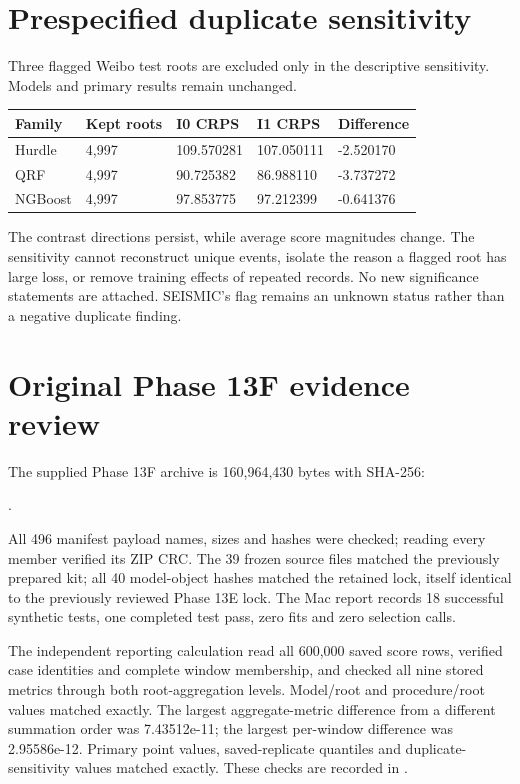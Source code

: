 \hypertarget{prespecified-duplicate-sensitivity}{%
\section{Prespecified duplicate sensitivity}\label{prespecified-duplicate-sensitivity}}

Three flagged Weibo test roots are excluded only in the descriptive sensitivity. Models and primary results remain unchanged.

\small\begin{longtable}[]{@{}lllll@{}}
\toprule\noalign{}
Family & Kept roots & I0 CRPS & I1 CRPS & Difference \\
\midrule\noalign{}
\endhead
\bottomrule\noalign{}
\endlastfoot
Hurdle & 4,997 & 109.570281 & 107.050111 & -2.520170 \\
QRF & 4,997 & 90.725382 & 86.988110 & -3.737272 \\
NGBoost & 4,997 & 97.853775 & 97.212399 & -0.641376 \\
\end{longtable}\normalsize

The contrast directions persist, while average score magnitudes change. The sensitivity cannot reconstruct unique events, isolate the reason a flagged root has large loss, or remove training effects of repeated records. No new significance statements are attached. SEISMIC's  flag remains an unknown status rather than a negative duplicate finding.

\hypertarget{original-phase-13f-evidence-review}{%
\section{Original Phase 13F evidence review}\label{original-phase-13f-evidence-review}}

The supplied Phase 13F archive is 160,964,430 bytes with SHA-256:

.

All 496 manifest payload names, sizes and hashes were checked; reading every member verified its ZIP CRC. The 39 frozen source files matched the previously prepared kit; all 40 model-object hashes matched the retained lock, itself identical to the previously reviewed Phase 13E lock. The Mac report records 18 successful synthetic tests, one completed test pass, zero fits and zero selection calls.

The independent reporting calculation read all 600,000 saved score rows, verified case identities and complete window membership, and checked all nine stored metrics through both root-aggregation levels. Model/root and procedure/root values matched exactly. The largest aggregate-metric difference from a different summation order was 7.43512e-11; the largest per-window difference was 2.95586e-12. Primary point values, saved-replicate quantiles and duplicate-sensitivity values matched exactly. These checks are recorded in .

